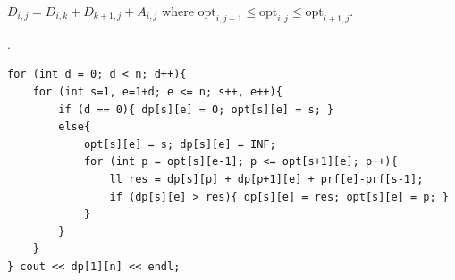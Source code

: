 $D_{i,j} = D_{i,k} + D_{k+1,j} + A_{i,j}$ where $\mathrm{opt}_{i,j-1} \le \mathrm{opt}_{i,j} \le \mathrm{opt}_{i+1,j}$.

.
\begin{verbatim}
for (int d = 0; d < n; d++){
	for (int s=1, e=1+d; e <= n; s++, e++){
		if (d == 0){ dp[s][e] = 0; opt[s][e] = s; }
		else{
			opt[s][e] = s; dp[s][e] = INF;
			for (int p = opt[s][e-1]; p <= opt[s+1][e]; p++){
				ll res = dp[s][p] + dp[p+1][e] + prf[e]-prf[s-1];
				if (dp[s][e] > res){ dp[s][e] = res; opt[s][e] = p; }
			}
		}
	}
} cout << dp[1][n] << endl;
\end{verbatim}